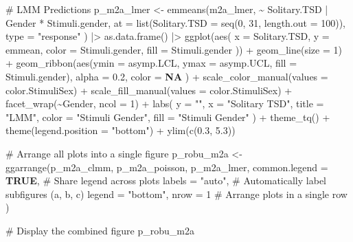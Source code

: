 \documentclass[
  bookmarksnumbered]{article}
\newenvironment{Shaded}{\begin{snugshade}}{\end{snugshade}}
\newcommand{\AttributeTok}[1]{\textcolor[rgb]{0.80,0.80,0.80}{#1}}
\newcommand{\CommentTok}[1]{\textcolor[rgb]{0.50,0.62,0.50}{#1}}
\newcommand{\ConstantTok}[1]{\textcolor[rgb]{0.86,0.64,0.64}{\textbf{#1}}}
\newcommand{\DecValTok}[1]{\textcolor[rgb]{0.86,0.86,0.80}{#1}}
\newcommand{\FloatTok}[1]{\textcolor[rgb]{0.75,0.75,0.82}{#1}}
\newcommand{\FunctionTok}[1]{\textcolor[rgb]{0.94,0.94,0.56}{#1}}
\newcommand{\NormalTok}[1]{\textcolor[rgb]{0.80,0.80,0.80}{#1}}
\newcommand{\OtherTok}[1]{\textcolor[rgb]{0.94,0.94,0.56}{#1}}
\newcommand{\SpecialCharTok}[1]{\textcolor[rgb]{0.86,0.64,0.64}{#1}}
\newcommand{\StringTok}[1]{\textcolor[rgb]{0.80,0.58,0.58}{#1}}
\begin{document}
\begin{Shaded}
\begin{Highlighting}[]
\CommentTok{\# LMM Predictions}
\NormalTok{p\_m2a\_lmer }\OtherTok{\textless{}{-}} \FunctionTok{emmeans}\NormalTok{(m2a\_lmer, }\SpecialCharTok{\textasciitilde{}}\NormalTok{ Solitary.TSD }\SpecialCharTok{|}\NormalTok{ Gender }\SpecialCharTok{*}\NormalTok{ Stimuli.gender,}
  \AttributeTok{at =} \FunctionTok{list}\NormalTok{(}\AttributeTok{Solitary.TSD =} \FunctionTok{seq}\NormalTok{(}\DecValTok{0}\NormalTok{, }\DecValTok{31}\NormalTok{, }\AttributeTok{length.out =} \DecValTok{100}\NormalTok{)),}
  \AttributeTok{type =} \StringTok{"response"}
\NormalTok{) }\SpecialCharTok{|\textgreater{}}
  \FunctionTok{as.data.frame}\NormalTok{() }\SpecialCharTok{|\textgreater{}}
  \FunctionTok{ggplot}\NormalTok{(}\FunctionTok{aes}\NormalTok{(}
    \AttributeTok{x =}\NormalTok{ Solitary.TSD, }\AttributeTok{y =}\NormalTok{ emmean,}
    \AttributeTok{color =}\NormalTok{ Stimuli.gender, }\AttributeTok{fill =}\NormalTok{ Stimuli.gender}
\NormalTok{  )) }\SpecialCharTok{+}
  \FunctionTok{geom\_line}\NormalTok{(}\AttributeTok{size =} \DecValTok{1}\NormalTok{) }\SpecialCharTok{+}
  \FunctionTok{geom\_ribbon}\NormalTok{(}\FunctionTok{aes}\NormalTok{(}\AttributeTok{ymin =}\NormalTok{ asymp.LCL, }\AttributeTok{ymax =}\NormalTok{ asymp.UCL, }\AttributeTok{fill =}\NormalTok{ Stimuli.gender),}
    \AttributeTok{alpha =} \FloatTok{0.2}\NormalTok{, }\AttributeTok{color =} \ConstantTok{NA}
\NormalTok{  ) }\SpecialCharTok{+}
  \FunctionTok{scale\_color\_manual}\NormalTok{(}\AttributeTok{values =}\NormalTok{ color.StimuliSex) }\SpecialCharTok{+}
  \FunctionTok{scale\_fill\_manual}\NormalTok{(}\AttributeTok{values =}\NormalTok{ color.StimuliSex) }\SpecialCharTok{+}
  \FunctionTok{facet\_wrap}\NormalTok{(}\SpecialCharTok{\textasciitilde{}}\NormalTok{Gender, }\AttributeTok{ncol =} \DecValTok{1}\NormalTok{) }\SpecialCharTok{+}
  \FunctionTok{labs}\NormalTok{(}
    \AttributeTok{y =} \StringTok{""}\NormalTok{, }\AttributeTok{x =} \StringTok{"Solitary TSD"}\NormalTok{, }\AttributeTok{title =} \StringTok{"LMM"}\NormalTok{,}
    \AttributeTok{color =} \StringTok{"Stimuli Gender"}\NormalTok{, }\AttributeTok{fill =} \StringTok{"Stimuli Gender"}
\NormalTok{  ) }\SpecialCharTok{+}
  \FunctionTok{theme\_tq}\NormalTok{() }\SpecialCharTok{+}
  \FunctionTok{theme}\NormalTok{(}\AttributeTok{legend.position =} \StringTok{"bottom"}\NormalTok{) }\SpecialCharTok{+}
  \FunctionTok{ylim}\NormalTok{(}\FunctionTok{c}\NormalTok{(}\FloatTok{0.3}\NormalTok{, }\FloatTok{5.3}\NormalTok{))}

\CommentTok{\# Arrange all plots into a single figure}
\NormalTok{p\_robu\_m2a }\OtherTok{\textless{}{-}} \FunctionTok{ggarrange}\NormalTok{(p\_m2a\_clmm, p\_m2a\_poisson, p\_m2a\_lmer,}
  \AttributeTok{common.legend =} \ConstantTok{TRUE}\NormalTok{, }\CommentTok{\# Share legend across plots}
  \AttributeTok{labels =} \StringTok{"auto"}\NormalTok{, }\CommentTok{\# Automatically label subfigures (a, b, c)}
  \AttributeTok{legend =} \StringTok{"bottom"}\NormalTok{,}
  \AttributeTok{nrow =} \DecValTok{1} \CommentTok{\# Arrange plots in a single row}
\NormalTok{)}

\CommentTok{\# Display the combined figure}
\NormalTok{p\_robu\_m2a}
\end{Highlighting}
\end{Shaded}
\end{document}
